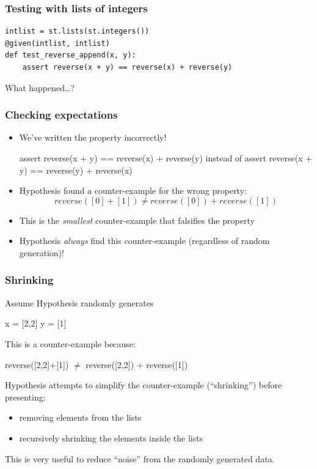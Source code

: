 \documentclass{beamer}
\begin{document}
\begin{frame}[fragile]
  \frametitle{Testing with lists of integers}

\begin{verbatim}
intlist = st.lists(st.integers())
@given(intlist, intlist)
def test_reverse_append(x, y):
    assert reverse(x + y) == reverse(x) + reverse(y)
\end{verbatim}
\medskip
\pause
  
What happened\ldots ?  
\end{frame}

\begin{frame}[fragile]
  \frametitle{Checking expectations}


\begin{itemize}
\item We've written the property incorrectly!
\begin{semiverbatim}
  assert reverse(x + y) == reverse(\alert{x}) + reverse(\alert{y})
      \textsf{instead of}
  assert reverse(x + y) == reverse(y) + reverse(x)  
\end{semiverbatim}
\item Hypothesis found a counter-example for the wrong property:
   \[ reverse([0]+[1]) \neq reverse([0]) + reverse([1]) \]
\item This is the \emph{smallest} counter-example
  that falsifies the property
\item Hypothesis \emph{always} find this counter-example
  (regardless of random generation)!
\end{itemize}
\end{frame}

\begin{frame}
  \frametitle{Shrinking}

Assume Hypothesis randomly generates
\begin{semiverbatim}
x = [2,2]
y = [1]
\end{semiverbatim}
This is a counter-example because:
\begin{semiverbatim}
      reverse([2,2]+[1]) \ensuremath{\neq}  reverse([2,2]) + reverse([1])
\end{semiverbatim}
\medskip

Hypothesis attempts to simplify
the counter-example (``shrinking'')
before presenting:
\begin{itemize}
\item removing elements from the lists
\item recursively shrinking the elements inside the lists
\end{itemize}
This is very useful to reduce ``noise'' from the randomly generated data.
\end{frame}
\end{document}
